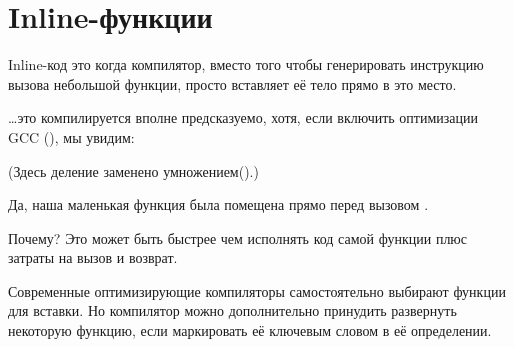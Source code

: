 \section{Inline-функции}
\label{inline_code}

Inline-код это когда компилятор, вместо того чтобы генерировать инструкцию вызова небольшой функции,
просто вставляет её тело прямо в это место.



\dots это компилируется вполне предсказуемо, хотя, если включить оптимизации GCC (\Othree), мы увидим:



(Здесь деление заменено умножением().)

Да, наша маленькая функция  была помещена прямо перед вызовом \printf.

Почему? Это может быть быстрее чем исполнять код самой функции плюс затраты на вызов и возврат.

Современные оптимизирующие компиляторы самостоятельно выбирают функции для вставки.
Но компилятор можно дополнительно принудить развернуть некоторую функцию, 
если маркировать её ключевым словом  в её определении.


